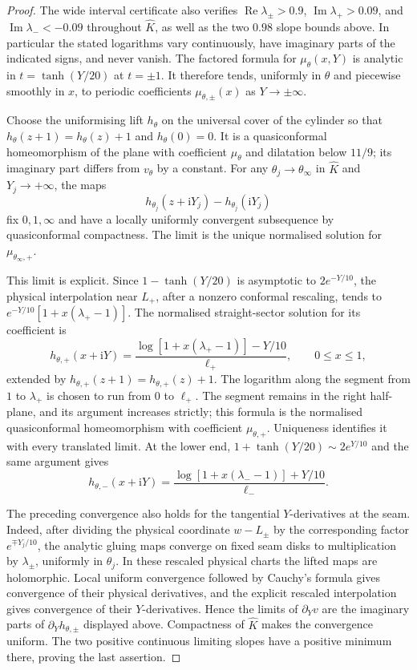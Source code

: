 \documentclass[11pt]{amsart}
\theoremstyle{definition}
\newcommand{\ii}{\mathrm{i}}
\begin{document}
\begin{proof}
The wide interval certificate also verifies
$\operatorname{Re}\lambda_\pm>0.9$,
$\operatorname{Im}\lambda_+>0.09$, and
$\operatorname{Im}\lambda_-<-0.09$ throughout $\widehat K$,
as well as the two $0.98$ slope bounds above.
In particular the stated logarithms vary continuously, have
imaginary parts of the indicated signs, and never vanish.
The factored formula for $\mu_\theta(x,Y)$ is analytic in
$t=\tanh(Y/20)$ at $t=\pm1$.  It therefore tends, uniformly in
$\theta$ and piecewise smoothly in $x$, to periodic coefficients
$\mu_{\theta,\pm}(x)$ as $Y\to\pm\infty$.

Choose the uniformising lift $h_\theta$ on the universal cover of
the cylinder so that $h_\theta(z+1)=h_\theta(z)+1$ and
$h_\theta(0)=0$.  It is a quasiconformal homeomorphism of the
plane with coefficient $\mu_\theta$ and dilatation below $11/9$;
its imaginary part differs from $v_\theta$ by a constant.
For any $\theta_j\to\theta_\infty$ in $\widehat K$ and
$Y_j\to+\infty$, the maps
\[
 h_{\theta_j}(z+\ii Y_j)-h_{\theta_j}(\ii Y_j)
\]
fix $0,1,\infty$ and have a locally uniformly convergent
subsequence by quasiconformal compactness.  The limit is the unique
normalised solution for $\mu_{\theta_\infty,+}$.

This limit is explicit.  Since $1-\tanh(Y/20)$ is asymptotic to
$2e^{-Y/10}$, the physical interpolation near $L_+$, after a
nonzero conformal rescaling, tends to
$e^{-Y/10}[1+x(\lambda_+-1)]$.  The normalised straight-sector
solution for its coefficient is
\[
 h_{\theta,+}(x+\ii Y)=
 \frac{\log[1+x(\lambda_+-1)]-Y/10}{\ell_+},
 \qquad 0\le x\le1,
\]
extended by $h_{\theta,+}(z+1)=h_{\theta,+}(z)+1$.
The logarithm along the segment from $1$ to $\lambda_+$ is chosen
to run from $0$ to $\ell_+$.  The segment remains in the right
half-plane, and its argument increases strictly; this formula is
the normalised quasiconformal homeomorphism with coefficient
$\mu_{\theta,+}$.  Uniqueness identifies it with every translated
limit.  At the lower end, $1+\tanh(Y/20)\sim2e^{Y/10}$ and the
same argument gives
\[
 h_{\theta,-}(x+\ii Y)=
 \frac{\log[1+x(\lambda_--1)]+Y/10}{\ell_-}.
\]

The preceding convergence also holds for the tangential
$Y$-derivatives at the seam.  Indeed, after dividing the physical
coordinate $w-L_\pm$ by the corresponding factor
$e^{\mp Y_j/10}$, the analytic gluing maps converge on fixed
seam disks to multiplication by $\lambda_\pm$, uniformly in
$\theta_j$.  In these rescaled physical charts the lifted maps
are holomorphic.  Local uniform convergence followed by Cauchy's
formula gives convergence of their physical derivatives, and the
explicit rescaled interpolation gives convergence of their
$Y$-derivatives.  Hence the limits of $\partial_Yv$ are the
imaginary parts of $\partial_Yh_{\theta,\pm}$ displayed above.
Compactness of $\widehat K$ makes the convergence uniform.
The two positive continuous limiting slopes have a positive
minimum there, proving the last assertion.
\end{proof}
\end{document}
